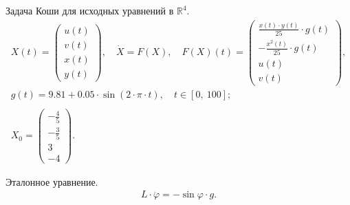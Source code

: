 \documentclass[a4paper,14pt]{extarticle}
\begin{document}
\noindent Задача Коши для исходных уравнений в $\mathbb{R}^4$.
\begin{gather*}
	X(t) = \left(\begin{array}{c}
		u(t) \\
		v(t) \\
		x(t) \\
		y(t)
	\end{array}\right),\quad\dot{X} = F(X),\quad
	F(X)(t) = \left(\begin{array}{c}
		\frac{x(t)\cdot y(t)}{25}\cdot g(t) \\
		-\frac{x^2(t)}{25}\cdot g(t) \\
		u(t) \\
		v(t)
	\end{array}\right), \\
	g(t) = 9.81 + 0.05\cdot\sin(2\cdot\pi\cdot t),\quad t\in[0,\ 100]; \\
	\\
	X_0 = \left(\begin{array}{c}
		-\frac{4}{5} \\
		-\frac{3}{5} \\
		3 \\
		-4
	\end{array}\right).
\end{gather*} \newpage

\noindent Эталонное уравнение.
\begin{gather*}
	L\cdot\ddot{\varphi} = -\sin\varphi\cdot g.
\end{gather*} \\ \par
\end{document}
